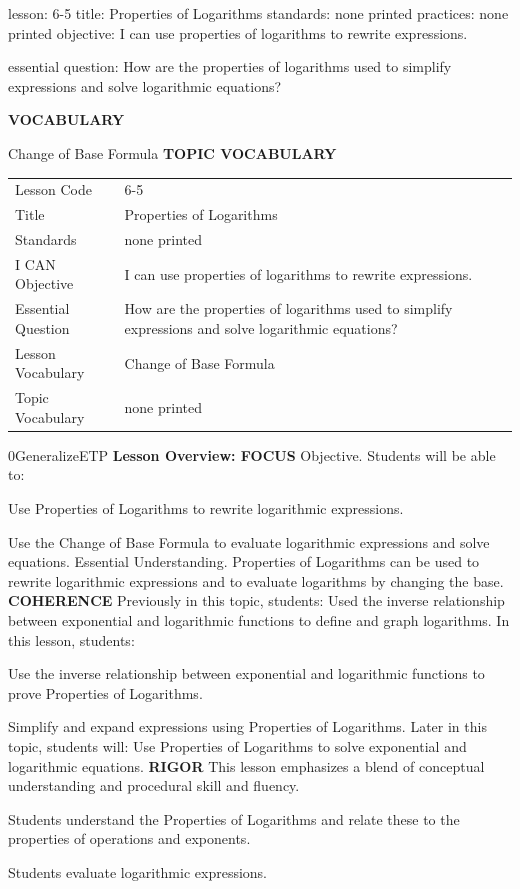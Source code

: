 \documentclass{article}
\newenvironment{lesson-meta}{}{}        %
\newenvironment{te-addendum}[2]{}{}     %
\newcommand{\te}[1]{}                   %
\begin{document}
\begin{lesson-meta}
lesson: 6-5
title: Properties of Logarithms
standards: none printed
practices: none printed
objective: I can use properties of logarithms to rewrite expressions.

essential question: How are the properties of logarithms used to simplify expressions and solve logarithmic equations?

\textbf{VOCABULARY}
\item Change of Base Formula
\textbf{TOPIC VOCABULARY}
\te{No separate topic vocabulary list is printed on these lesson pages.}
\begin{tabular}{ll}
Lesson Code & 6-5 \\
Title & Properties of Logarithms \\
Standards & none printed \\
I CAN Objective & I can use properties of logarithms to rewrite expressions. \\
Essential Question & How are the properties of logarithms used to simplify expressions and solve logarithmic equations? \\
Lesson Vocabulary & Change of Base Formula \\
Topic Vocabulary & none printed \\
\end{tabular}
\end{lesson-meta}
\begin{te-addendum}{0}{GeneralizeETP}
\textbf{Lesson Overview: FOCUS}
Objective. Students will be able to:
\item Use Properties of Logarithms to rewrite logarithmic expressions.
\item Use the Change of Base Formula to evaluate logarithmic expressions and solve equations.
Essential Understanding. Properties of Logarithms can be used to rewrite logarithmic expressions and to evaluate logarithms by changing the base.
\textbf{COHERENCE}
Previously in this topic, students: Used the inverse relationship between exponential and logarithmic functions to define and graph logarithms.
In this lesson, students:
\item Use the inverse relationship between exponential and logarithmic functions to prove Properties of Logarithms.
\item Simplify and expand expressions using Properties of Logarithms.
Later in this topic, students will: Use Properties of Logarithms to solve exponential and logarithmic equations.
\textbf{RIGOR}
This lesson emphasizes a blend of conceptual understanding and procedural skill and fluency.
\item Students understand the Properties of Logarithms and relate these to the properties of operations and exponents.
\item Students evaluate logarithmic expressions.
\end{te-addendum}
\end{document}
